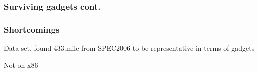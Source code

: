 \begin{frame}
	\frametitle{Surviving gadgets cont.}


\end{frame}

\begin{frame}
	\frametitle{Shortcomings}

	Data set. \textcite{large-scale-automated} found 433.milc from SPEC2006 to be representative
	in terms of gadgets

	\vspace{0.5cm}

	Not on x86

\end{frame}
